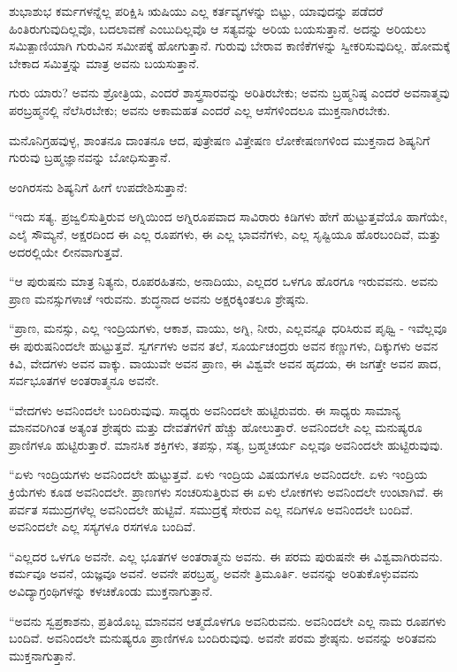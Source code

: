 ಶುಭಾಶುಭ ಕರ್ಮಗಳನ್ನೆಲ್ಲ ಪರಿಕ್ಷಿಸಿ ಋಷಿಯು ಎಲ್ಲ ಕರ್ತವ್ಯಗಳನ್ನು ಬಿಟ್ಟು, ಯಾವುದನ್ನು ಪಡೆದರೆ ಹಿಂತಿರುಗುವುದಿಲ್ಲವೊ, ಬದಲಾವಣೆ ಎಂಬುದಿಲ್ಲವೊ ಆ ಸತ್ಯವನ್ನು ಅರಿಯ ಬಯಸುತ್ತಾನೆ. ಅದನ್ನು ಅರಿಯಲು ಸಮಿತ್ಪಾಣಿಯಾಗಿ ಗುರುವಿನ ಸಮೀಪಕ್ಕೆ ಹೋಗುತ್ತಾನೆ. ಗುರುವು ಬೇರಾವ ಕಾಣಿಕೆಗಳನ್ನು ಸ್ವೀಕರಿಸುವುದಿಲ್ಲ. ಹೋಮಕ್ಕೆ ಬೇಕಾದ ಸಮಿತ್ತನ್ನು ಮಾತ್ರ ಅವನು ಬಯಸುತ್ತಾನೆ.

ಗುರು ಯಾರು? ಅವನು ಶ್ರೋತ್ರಿಯ, ಎಂದರೆ ಶಾಸ್ತ್ರಸಾರವನ್ನು ಅರಿತಿರಬೇಕು; ಅವನು ಬ್ರಹ್ಮನಿಷ್ಠ ಎಂದರೆ ಅವನಾತ್ಮವು ಪರಬ್ರಹ್ಮನಲ್ಲಿ ನೆಲೆಸಿರಬೇಕು; ಅವನು ಅಕಾಮಹತ ಎಂದರೆ ಎಲ್ಲ ಆಸೆಗಳಿಂದಲೂ ಮುಕ್ತನಾಗಿರಬೇಕು.

ಮನೊನಿಗ್ರಹವುಳ್ಳ, ಶಾಂತನೂ ದಾಂತನೂ ಆದ, ಪುತ್ರೇಷಣ ವಿತ್ತೇಷಣ ಲೋಕೇಷಣಗಳಿಂದ ಮುಕ್ತನಾದ ಶಿಷ್ಯನಿಗೆ ಗುರುವು ಬ್ರಹ್ಮಜ್ಞಾನವನ್ನು ಬೋಧಿಸುತ್ತಾನೆ.

ಅಂಗಿರಸನು ಶಿಷ್ಯನಿಗೆ ಹೀಗೆ ಉಪದೇಶಿಸುತ್ತಾನೆ:

“ಇದು ಸತ್ಯ. ಪ್ರಜ್ವಲಿಸುತ್ತಿರುವ ಅಗ್ನಿಯಿಂದ ಅಗ್ನಿರೂಪವಾದ ಸಾವಿರಾರು ಕಿಡಿಗಳು ಹೇಗೆ ಹುಟ್ಟುತ್ತವೆಯೊ ಹಾಗೆಯೇ, ಎಲೈ ಸೌಮ್ಯನೆ, ಅಕ್ಷರದಿಂದ ಈ ಎಲ್ಲ ರೂಪಗಳು, ಈ ಎಲ್ಲ ಭಾವನೆಗಳು, ಎಲ್ಲ ಸೃಷ್ಟಿಯೂ ಹೊರಬಂದಿವೆ, ಮತ್ತು ಅದರಲ್ಲಿಯೇ ಲೀನವಾಗುತ್ತವೆ.

“ಆ ಪುರುಷನು ಮಾತ್ರ ನಿತ್ಯನು, ರೂಪರಹಿತನು, ಅನಾದಿಯು, ಎಲ್ಲದರ ಒಳಗೂ ಹೊರಗೂ ಇರುವವನು. ಅವನು ಪ್ರಾಣ ಮನಸ್ಸುಗಳಾಚೆ ಇರುವನು. ಶುದ್ಧನಾದ ಅವನು ಅಕ್ಷರಕ್ಕಿಂತಲೂ ಶ್ರೇಷ್ಠನು.

“ಪ್ರಾಣ, ಮನಸ್ಸು, ಎಲ್ಲ ಇಂದ್ರಿಯಗಳು, ಆಕಾಶ, ವಾಯು, ಅಗ್ನಿ, ನೀರು, ಎಲ್ಲವನ್ನೂ ಧರಿಸಿರುವ ಪೃಥ್ವಿ - ಇವೆಲ್ಲವೂ ಈ ಪುರುಷನಿಂದಲೇ ಹುಟ್ಟುತ್ತವೆ. ಸ್ವರ್ಗಗಳು ಅವನ ತಲೆ, ಸೂರ್ಯಚಂದ್ರರು ಅವನ ಕಣ್ಣುಗಳು, ದಿಕ್ಕುಗಳು ಅವನ ಕಿವಿ, ವೇದಗಳು ಅವನ ವಾಕ್ಕು. ವಾಯುವೇ ಅವನ ಪ್ರಾಣ, ಈ ವಿಶ್ವವೇ ಅವನ ಹೃದಯ, ಈ ಜಗತ್ತೇ ಅವನ ಪಾದ, ಸರ್ವಭೂತಗಳ ಅಂತರಾತ್ಮನೂ ಅವನೇ.

“ವೇದಗಳು ಅವನಿಂದಲೇ ಬಂದಿರುವುವು. ಸಾಧ್ಯರು ಅವನಿಂದಲೇ ಹುಟ್ಟಿರುವರು. ಈ ಸಾಧ್ಯರು ಸಾಮಾನ್ಯ ಮಾನವರಿಗಿಂತ ಅತ್ಯಂತ ಶ್ರೇಷ್ಠರು ಮತ್ತು ದೇವತೆಗಳಿಗೆ ಹೆಚ್ಚು ಹೋಲುತ್ತಾರೆ. ಅವನಿಂದಲೇ ಎಲ್ಲ ಮನುಷ್ಯರೂ ಪ್ರಾಣಿಗಳೂ ಹುಟ್ಟಿರುತ್ತಾರೆ. ಮಾನಸಿಕ ಶಕ್ತಿಗಳು, ತಪಸ್ಸು, ಸತ್ಯ, ಬ್ರಹ್ಮಚರ್ಯ ಎಲ್ಲವೂ ಅವನಿಂದಲೇ ಹುಟ್ಟಿರುವುವು.

“ಏಳು ಇಂದ್ರಿಯಗಳು ಅವನಿಂದಲೇ ಹುಟ್ಟುತ್ತವೆ. ಏಳು ಇಂದ್ರಿಯ ವಿಷಯಗಳೂ ಅವನಿಂದಲೇ. ಏಳು ಇಂದ್ರಿಯ ಕ್ರಿಯೆಗಳು ಕೂಡ ಅವನಿಂದಲೇ. ಪ್ರಾಣಗಳು ಸಂಚರಿಸುತ್ತಿರುವ ಈ ಏಳು ಲೋಕಗಳು ಅವನಿಂದಲೇ ಉಂಟಾಗಿವೆ. ಈ ಪರ್ವತ ಸಮುದ್ರಗಳೆಲ್ಲ ಅವನಿಂದಲೇ ಹುಟ್ಟಿವೆ. ಸಮುದ್ರಕ್ಕೆ ಸೇರುವ ಎಲ್ಲ ನದಿಗಳೂ ಅವನಿಂದಲೇ ಬಂದಿವೆ. ಅವನಿಂದಲೇ ಎಲ್ಲ ಸಸ್ಯಗಳೂ ರಸಗಳೂ ಬಂದಿವೆ.

“ಎಲ್ಲದರ ಒಳಗೂ ಅವನೇ. ಎಲ್ಲ ಭೂತಗಳ ಅಂತರಾತ್ಮನು ಅವನು. ಈ ಪರಮ ಪುರುಷನೇ ಈ ವಿಶ್ವವಾಗಿರುವನು. ಕರ್ಮವೂ ಅವನೆ, ಯಜ್ಞವೂ ಅವನೆ. ಅವನೇ ಪರಬ್ರಹ್ಮ, ಅವನೇ ತ್ರಿಮೂರ್ತಿ. ಅವನನ್ನು ಅರಿತುಕೊಳ್ಳುವವನು ಅವಿದ್ಯಾಗ್ರಂಥಿಗಳನ್ನು ಕಳಚಿಕೊಂಡು ಮುಕ್ತನಾಗುತ್ತಾನೆ.

“ಅವನು ಸ್ವಪ್ರಕಾಶನು, ಪ್ರತಿಯೊಬ್ಬ ಮಾನವನ ಆತ್ಮದೊಳಗೂ ಅವನಿರುವನು. ಅವನಿಂದಲೇ ಎಲ್ಲ ನಾಮ ರೂಪಗಳು ಬಂದಿವೆ. ಅವನಿಂದಲೇ ಮನುಷ್ಯರೂ ಪ್ರಾಣಿಗಳೂ ಬಂದಿರುವುವು. ಅವನೇ ಪರಮ ಶ್ರೇಷ್ಠನು. ಅವನನ್ನು ಅರಿತವನು ಮುಕ್ತನಾಗುತ್ತಾನೆ.


